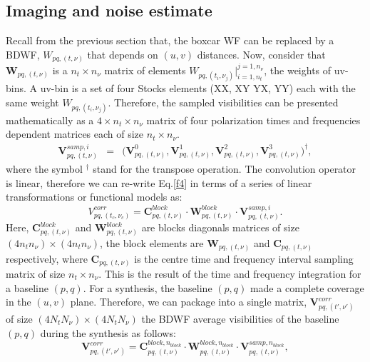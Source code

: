 \documentclass[useAMS,usenatbib]{mn2e}
\begin{document}
\subsection{Imaging and noise estimate}
\label{sec:imaging}
Recall from the previous section that, the boxcar WF can be replaced by a BDWF, $W_{pq,(t,\nu)}$ that depends 
on $(u,v)$ distances. Now, consider that $\mathcal{\textbf{W}}_{pq,(t,\nu)}$ is a $n_t \times n_{\nu}$ matrix of elements 
$W_{pq,(t_i,\nu_j)}\Big|_{i=1,n_t}^{j=1, n_{\nu}}$, the weights of uv-bins. A uv-bin is a set of four Stocks elements (XX, XY YX, YY) each 
with the same weight $W_{pq,(t_i,\nu_j)}$. Therefore, the sampled visibilities can be presented mathematically as a $4\times n_t\times 
n_{\nu}$ matrix of four polarization times and frequencies dependent matrices each of size $n_t\times n_{\nu}$.
\begin{eqnarray*}
\mathbf{V}_{pq,(t,\nu)}^{samp,i}&=&\Bigg(\mathbf{V}_{pq,(t,\nu)}^{0},\mathbf { V } 
^1_{pq,(t,\nu)},\mathbf{V}^2_{pq,(t,\nu)},\mathbf{V}_{pq,(t,\nu)}^{3 } \Bigg)^{\dagger}, \label{eqx:conv}
\end{eqnarray*}
where the symbol $^{\dagger}$ stand for the transpose operation. The convolution operator is linear, therefore we can re-write Eq.\ref{f4} 
in terms of a series of linear transformations or functional models as:
\begin{equation}
V_{pq,(t_c,\nu_c)}^{corr}= \mathbf{C}_{pq,(t,\nu)}^{block}\cdot\mathbf{W}_{pq,(t,\nu)}^{block}\cdot 
\mathbf{V}_{pq,(t,\nu)}^{samp,i}.\label{eqbb:linear}
\end{equation}
Here, $\mathbf{C}_{pq,(t,\nu)}^{block}$ and $\mathbf{W}_{pq,(t,\nu)}^{block}$ are  blocks diagonals matrices of size $(4n_t 
n_{\nu})\times(4n_t n_{\nu})$, the block elements are $\mathcal{\textbf{W}}_{pq,(t,\nu)}$ and $\mathbf{C}_{pq,(t,\nu)}$ 
respectively, where $\mathbf{C}_{pq,(t,\nu)}$ is the centre time and frequency interval sampling matrix of size $n_t\times 
n_{\nu}$. This
is the result of the time and frequency integration for a baseline $(p,q)$.
For a synthesis, the baseline $(p,q)$ made a complete  coverage in the $(u,v)$ plane. Therefore, we can  
package into a single matrix, $\mathbf{V}_{pq,(t',\nu')}^{corr}$ of size $(4N_t N_{\nu})\times (4N_t N_{\nu})$ the 
BDWF average visibilities of the  baseline $(p,q)$ during the synthesis as follows: 
\begin{equation}
\mathbf{V}_{pq,(t',\nu')}^{corr}=\mathbf{C}_{pq,(t,\nu)}^{block,n_{block}}\cdot 
\mathbf{W}_{pq,(t,\nu)}^{block,n_{block}}\cdot\mathbf{V}_{pq,(t,\nu)}^{samp,n_{block}},\label{eq2:block}
\end{equation}
\end{document}
